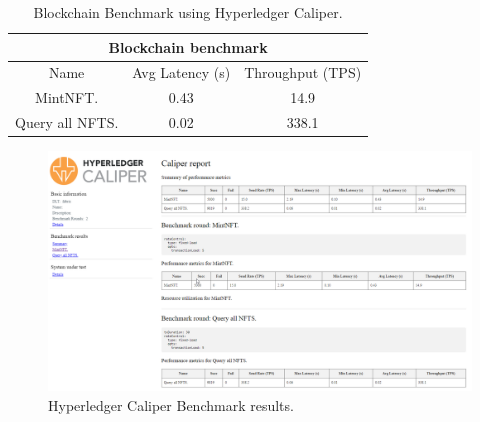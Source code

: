 \begin{table}[h!]
\begin{center}
\begin{tabular}{ |c|c|c|  }
 \hline
 \multicolumn{3}{|c|}{Blockchain benchmark} \\
 \hline
 Name & Avg Latency (s) & Throughput (TPS)\\
 \hline
 MintNFT.           & 0.43 & 14.9 \\
 Query all NFTS.    & 0.02 & 338.1 \\
 \hline
\end{tabular}
\caption{Blockchain Benchmark using Hyperledger Caliper.}
\label{table:Benchmark2}
\end{center}
\end{table}

 \begin{figure}[!h]
        \centering
        \includegraphics[width=15cm]{img/Caliper.png}
        \caption{Hyperledger Caliper Benchmark results.}
        \label{fig:CaliperBenchmark}
    \end{figure}
